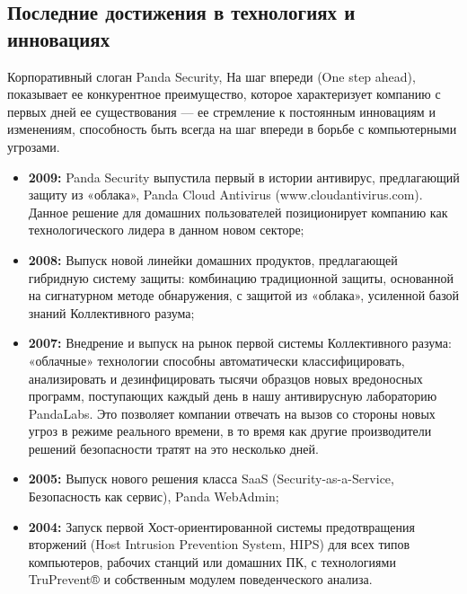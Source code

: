     \subsection{Последние достижения в технологиях и инновациях}
        Корпоративный слоган Panda Security, На шаг впереди (One step ahead), показывает ее конкурентное преимущество,
        которое характеризует компанию с первых дней ее существования — ее стремление к постоянным
        инновациям и изменениям, способность быть всегда на шаг впереди в борьбе с компьютерными угрозами.
        \begin{itemize}
            \item {\bf 2009:} Panda Security выпустила первый в истории антивирус, предлагающий защиту из
            «облака», Panda Cloud Antivirus (www.cloudantivirus.com). Данное решение для домашних пользователей
            позиционирует компанию как технологического лидера в данном новом секторе;
            \item {\bf 2008:} Выпуск новой линейки домашних продуктов, предлагающей гибридную систему защиты:
            комбинацию традиционной защиты, основанной на сигнатурном методе обнаружения, с защитой из «облака», 
            усиленной базой знаний Коллективного разума;
            \item {\bf 2007:} Внедрение и выпуск на рынок первой системы Коллективного разума: «облачные»
            технологии способны автоматически классифицировать, анализировать и дезинфицировать тысячи образцов
            новых вредоносных программ, поступающих каждый день в нашу антивирусную лабораторию PandaLabs. Это
            позволяет компании отвечать на вызов со стороны новых угроз в режиме реального времени, в то время
            как другие производители решений безопасности тратят на это несколько дней.
            \item {\bf 2005:} Выпуск нового решения класса SaaS (Security-as-a-Service, Безопасность как сервис),
            Panda WebAdmin;
            \item {\bf 2004:} Запуск первой Хост-ориентированной системы предотвращения вторжений (Host Intrusion
            Prevention System, HIPS) для всех типов компьютеров, рабочих станций или домашних ПК, с технологиями
            TruPrevent® и собственным модулем поведенческого анализа.
        \end{itemize}

